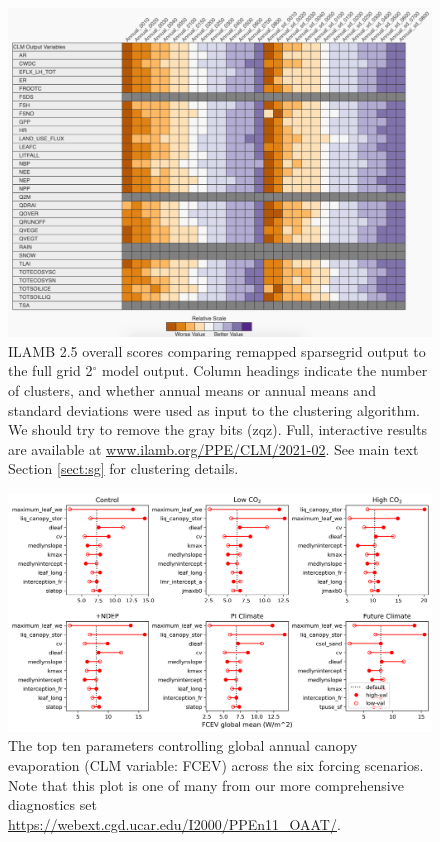 \documentclass[draft]{agujournal2019}
\begin{document}
\begin{figure}[h]
\centering
\includegraphics[width=42pc]{../figs/supp/ilamb.pdf}
\caption{ILAMB 2.5 overall scores comparing remapped sparsegrid output to the full grid 2$^{\circ}$ model output. Column headings indicate the number of clusters, and whether annual means or annual means and standard deviations were used as input to the clustering algorithm. We should try to remove the gray bits (zqz). Full, interactive results are available at \url{www.ilamb.org/PPE/CLM/2021-02}. See main text Section \ref{sect:sg} for clustering details.}
\label{supp:ilamb}
\end{figure}

\begin{figure}[h]
\centering
\includegraphics[width=\textwidth]{../figs/supp/FCEV_global_mean.png}
\caption{The top ten parameters controlling global annual canopy evaporation (CLM variable: FCEV) across the six forcing scenarios. Note that this plot is one of many from our more comprehensive diagnostics set \url{https://webext.cgd.ucar.edu/I2000/PPEn11_OAAT/}.}
\label{supp:fcev}
\end{figure}
\end{document}
